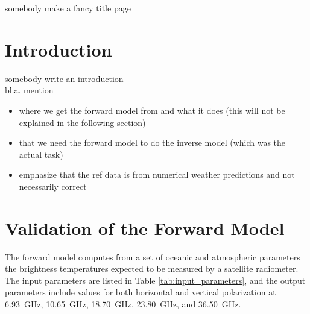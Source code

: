 \documentclass[11pt, a4paper]{article}
\begin{document}
\begin{titlepage}
\centering
{somebody make a fancy title page}
\end{titlepage}





\tableofcontents





\newpage
\section{Introduction}

somebody write an introduction \\

bl.a. mention
\begin{itemize}
\item where we get the forward model from and what it does (this will not be explained in the following section)
\item that we need the forward model to do the inverse model (which was the actual task)
\item emphasize that the ref data is from numerical weather predictions and not necessarily correct
\end{itemize}






\newpage
\section{Validation of the Forward Model}

The forward model computes from a set of oceanic and atmospheric parameters the brightness temperatures expected to be measured by a satellite radiometer. The input parameters are listed in Table \ref{tab:input_parameters}, and the output parameters include values for both horizontal and vertical polarization at \SI{6.93}{GHz}, \SI{10.65}{GHz}, \SI{18.70}{GHz}, \SI{23.80}{GHz}, and \SI{36.50}{GHz}.
\end{document}
